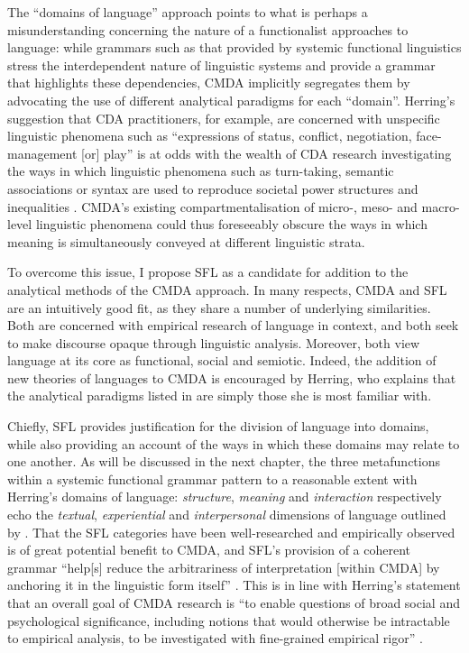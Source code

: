 
			The ``domains of language'' approach points to what is perhaps a misunderstanding concerning the nature of a functionalist approaches to language: while grammars such as that provided by systemic functional linguistics stress the interdependent nature of linguistic systems and provide a grammar that highlights these dependencies, CMDA implicitly segregates them by advocating the use of different analytical paradigms for each ``domain''. Herring's suggestion that CDA practitioners, for example, are concerned with unspecific linguistic phenomena such as ``expressions of status, conflict, negotiation, face-management [or] play'' \citeyear[p.~18]{herring_computer-mediated_2004} is at odds with the wealth of CDA research investigating the ways in which linguistic phenomena such as turn-taking, semantic associations or syntax are used to reproduce societal power structures and inequalities \cite{wodak_methods_2009}. CMDA's existing compartmentalisation of micro-, meso- and macro-level linguistic phenomena could thus foreseeably obscure the ways in which meaning is simultaneously conveyed at different linguistic strata.

			To overcome this issue, I propose SFL as a candidate for addition to the analytical methods of the CMDA approach. In many respects, CMDA and SFL are an intuitively good fit, as they share a number of underlying similarities. Both are concerned with empirical research of language in context, and both seek to make discourse opaque through linguistic analysis. Moreover, both view language at its core as functional, social and semiotic. Indeed, the addition of new theories of languages to CMDA is encouraged by Herring, who explains that the analytical paradigms listed in \citeyear{herring_computer-mediated_2004} are simply those she is most familiar with.

			Chiefly, SFL provides justification for the division of language into domains, while also providing an account of the ways in which these domains may relate to one another.  As will be discussed in the next chapter, the three metafunctions within a systemic functional grammar pattern to a reasonable extent with Herring's domains of language: \emph{structure}, \emph{meaning} and \emph{interaction} respectively echo the \emph{textual}, \emph{experiential} and \emph{interpersonal} dimensions of language outlined by \textcite{halliday_language_1994}. That the SFL categories have been well-researched and empirically observed is of great potential benefit to CMDA, and SFL's provision of a coherent grammar ``help[s] reduce the arbitrariness of interpretation [within CMDA] by anchoring it in the linguistic form itself'' \cite[p.~23]{galasinski_fathers_2013}. This is in line with Herring's statement that an overall goal of CMDA research is ``to enable questions of broad social and psychological significance, including notions that would otherwise be intractable to empirical analysis, to be investigated with fine-grained empirical rigor'' \cite[p.~2]{herring_computer-mediated_2004}.

